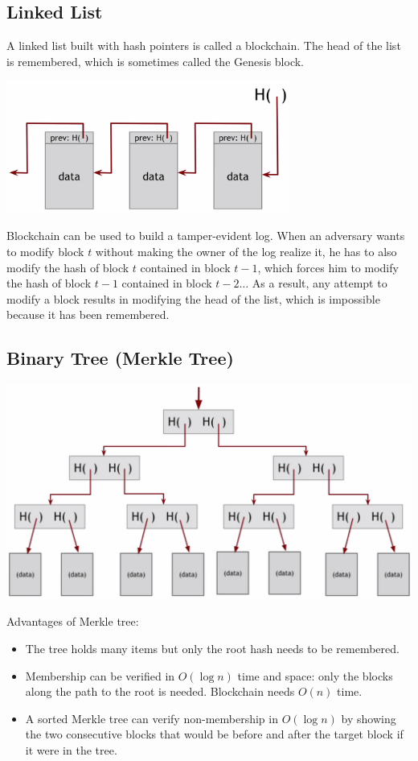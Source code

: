 \subsection{Linked List}
A linked list built with hash pointers is called a blockchain. The head of the list is remembered, which is sometimes called the Genesis block.
\begin{center}
  \includegraphics[width=0.7\textwidth]{linklist.png}
\end{center}
Blockchain can be used to build a tamper-evident log. When an adversary wants to modify block $t$ without making the owner of the log realize it, he has to also modify the hash of block $t$ contained in  block $t-1$, which forces him to modify the hash of block $t-1$ contained in block $t-2\dots$ As a result, any attempt to modify a block results in modifying the head of the list, which is impossible because it has been remembered.
\subsection{Binary Tree (Merkle Tree)}
\begin{center}
  \includegraphics[width=\textwidth]{merkletree.png}
\end{center}
Advantages of Merkle tree: 
\begin{itemize}
  \item The tree holds many items but only the root hash needs to be remembered.
  \item Membership can be verified in $O(\log n)$ time and space: only the blocks along the path to the root is needed. Blockchain needs $O(n)$ time.
  \item A sorted Merkle tree can verify non-membership in $O(\log n)$ by showing the two consecutive blocks that would be before and after the target block if it were in the tree. 
\end{itemize}
